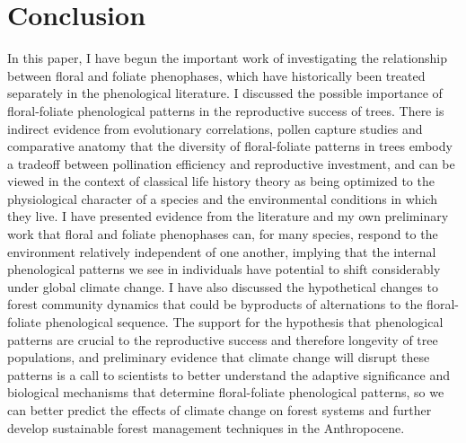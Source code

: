 \documentclass{article}\usepackage[]{graphicx}\usepackage[]{color}
\begin{document}
\section*{Conclusion}
In this paper, I have begun the important work of investigating the relationship between floral and foliate phenophases, which have historically been treated separately in the phenological literature. I discussed the possible importance of floral-foliate phenological patterns in the reproductive success of trees. There is indirect evidence from evolutionary correlations, pollen capture studies and comparative anatomy that the diversity of floral-foliate patterns in trees embody a tradeoff between pollination efficiency and reproductive investment, and can be viewed in the context of classical life history theory as being optimized to the physiological character of a species and the environmental conditions in which they live. I have presented evidence from the literature and my own preliminary work that floral and foliate phenophases can, for many species, respond to the environment relatively independent of one another, implying that the internal phenological patterns we see in individuals have potential to shift considerably under global climate change. I have also discussed the hypothetical changes to forest community dynamics that could be byproducts of alternations to the floral-foliate phenological sequence. The support for the hypothesis that phenological patterns are crucial to the reproductive success and therefore longevity of tree populations, and preliminary evidence that climate change will disrupt these patterns is a call to scientists to better understand the adaptive significance and biological mechanisms that determine floral-foliate phenological patterns, so we can better predict the effects of climate change on forest systems and further develop sustainable forest management techniques in the Anthropocene.



\end{document}
